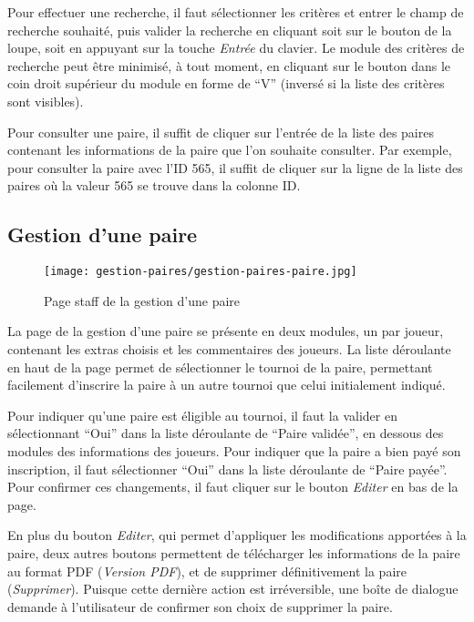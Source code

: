 Pour effectuer une recherche, il faut sélectionner les critères et entrer le champ de recherche souhaité, puis valider la recherche en cliquant soit sur le bouton de la loupe, soit en appuyant sur la touche \textit{Entrée} du clavier. Le module des critères de recherche peut être minimisé, à tout moment, en cliquant sur le bouton dans le coin droit supérieur du module en forme de \enquote{V} (inversé si la liste des critères sont visibles).\newline

Pour consulter une paire, il suffit de cliquer sur l'entrée de la liste des paires contenant les informations de la paire que l'on souhaite consulter. Par exemple, pour consulter la paire avec l'ID 565, il suffit de cliquer sur la ligne de la liste des paires où la valeur 565 se trouve dans la colonne ID.

\subsection{Gestion d'une paire}

\begin{figure}[H]
\centering
\texttt{[image: gestion-paires/gestion-paires-paire.jpg]}
\caption{Page staff de la gestion d'une paire}
\end{figure}

La page de la gestion d'une paire se présente en deux modules, un par joueur, contenant les extras choisis et les commentaires des joueurs. La liste déroulante en haut de la page permet de sélectionner le tournoi de la paire, permettant facilement d'inscrire la paire à un autre tournoi que celui initialement indiqué.\newline

Pour indiquer qu'une paire est éligible au tournoi, il faut la valider en sélectionnant \enquote{Oui} dans la liste déroulante de \enquote{Paire validée}, en dessous des modules des informations des joueurs. Pour indiquer que la paire a bien payé son inscription, il faut sélectionner \enquote{Oui} dans la liste déroulante de \enquote{Paire payée}. Pour confirmer ces changements, il faut cliquer sur le bouton \textit{Editer} en bas de la page.\newline

En plus du bouton \textit{Editer}, qui permet d'appliquer les modifications apportées à la paire, deux autres boutons permettent de télécharger les informations de la paire au format PDF (\textit{Version PDF}), et de supprimer définitivement la paire (\textit{Supprimer}). Puisque cette dernière action est irréversible, une boîte de dialogue demande à l'utilisateur de confirmer son choix de supprimer la paire.
